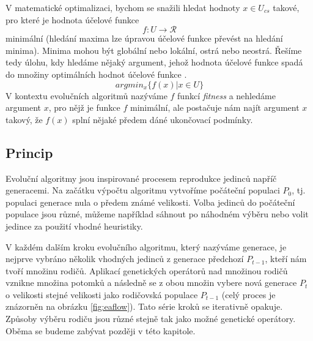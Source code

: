 V matematické optimalizaci, bychom se snažili hledat hodnoty $x \in U_{cs}$ takové,
pro které je hodnota účelové funkce
$$ f : U \to \mathcal{R} $$
minimální (hledání maxima lze úpravou účelové funkce převést na hledání minima).
Minima mohou být globální nebo lokální, ostrá nebo neostrá. Řešíme tedy úlohu,
kdy hledáme nějaký argument, jehož hodnota účelové funkce spadá do množiny optimálních
hodnot účelové funkce \cite{nlprog}.
$$ argmin_{x}\{f(x)|x \in U\} $$		
V kontextu evolučních algoritmů nazýváme $f$ funkcí \textit{fitness} a nehledáme 
argument $x$, pro nějž je funkce $f$ minimální, ale postačuje nám najít argument $x$ 
takový, že $f(x)$ splní nějaké předem dáné ukončovací podmínky.

\subsection{Princip}
Evoluční algoritmy jsou inspirované procesem reprodukce jedinců napříč generacemi.
Na začátku výpočtu algoritmu vytvoříme počáteční populaci $P_{0}$, tj.
populaci generace nula o předem známé velikosti.
Volba jedinců do počáteční populace jsou různé, můžeme například sáhnout po náhodném 
výběru nebo volit jedince za použití vhodné heuristiky.

V každém dalším kroku evolučního algoritmu, který nazýváme generace, je nejprve vybráno
několik vhodných jedinců z generace předchozí $P_{t - 1}$, kteří nám tvoří množinu rodičů. Aplikací
genetických operátorů nad množinou rodičů vznikne množina potomků a následně se z obou
množin vybere nová generace $P_{t}$ o velikosti stejné velikosti jako rodičovská populace $P_{t - 1}$
(celý proces je znázorněn na obrázku \ref{fig:eaflow}). Tato série kroků se iterativně opakuje.
Způsoby výběru rodiču jsou různé stejně
tak jako možné genetické operátory. Oběma se budeme zabývat později v této kapitole.

